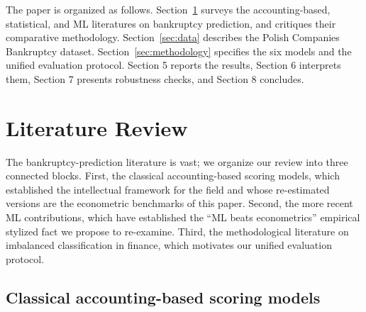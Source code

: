 \documentclass[11pt,a4paper]{article}
\begin{document}
The paper is organized as follows. Section~\ref{sec:lit} surveys the
accounting-based, statistical, and ML literatures on bankruptcy prediction,
and critiques their comparative methodology. Section~\ref{sec:data} describes
the Polish Companies Bankruptcy dataset. Section~\ref{sec:methodology}
specifies the six models and the unified evaluation protocol. Section 5
reports the results, Section 6 interprets them, Section 7 presents robustness
checks, and Section 8 concludes.

\section{Literature Review}\label{sec:lit}

The bankruptcy-prediction literature is vast; we organize our review into
three connected blocks. First, the classical accounting-based scoring models,
which established the intellectual framework for the field and whose
re-estimated versions are the econometric benchmarks of this paper. Second,
the more recent ML contributions, which have established the ``ML beats
econometrics'' empirical stylized fact we propose to re-examine. Third, the
methodological literature on imbalanced classification in finance, which
motivates our unified evaluation protocol.

\subsection{Classical accounting-based scoring models}
\end{document}
